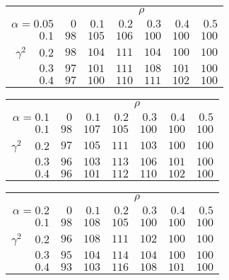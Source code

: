 \begin{tabular}{r|rrrrrr}
\hline\hline
 &\multicolumn{6}{c}{$\rho$} \\ 
 $\alpha = 0.05$ & $0$ & $0.1$ & $0.2$ & $0.3$ & $0.4$ & $0.5$ \\ 
 \hline$0.1$ & $ 98$ & $105$ & $106$ & $100$ & $100$ & $100$\\ 
$\gamma^2\;\;\;$ $0.2$ & $ 98$ & $104$ & $111$ & $104$ & $100$ & $100$\\ 
$0.3$ & $ 97$ & $101$ & $111$ & $108$ & $101$ & $100$\\ 
$0.4$ & $ 97$ & $100$ & $110$ & $111$ & $102$ & $100$\\ 
 \hline 
 \end{tabular}
 
 \vspace{2em} 
 
\begin{tabular}{r|rrrrrr}
\hline\hline
 &\multicolumn{6}{c}{$\rho$} \\ 
 $\alpha = 0.1$ & $0$ & $0.1$ & $0.2$ & $0.3$ & $0.4$ & $0.5$ \\ 
 \hline$0.1$ & $ 98$ & $107$ & $105$ & $100$ & $100$ & $100$\\ 
$\gamma^2\;\;\;$ $0.2$ & $ 97$ & $105$ & $111$ & $103$ & $100$ & $100$\\ 
$0.3$ & $ 96$ & $103$ & $113$ & $106$ & $101$ & $100$\\ 
$0.4$ & $ 96$ & $101$ & $112$ & $110$ & $102$ & $100$\\ 
 \hline 
 \end{tabular}
 
 \vspace{2em} 
 
\begin{tabular}{r|rrrrrr}
\hline\hline
 &\multicolumn{6}{c}{$\rho$} \\ 
 $\alpha = 0.2$ & $0$ & $0.1$ & $0.2$ & $0.3$ & $0.4$ & $0.5$ \\ 
 \hline$0.1$ & $ 98$ & $108$ & $105$ & $100$ & $100$ & $100$\\ 
$\gamma^2\;\;\;$ $0.2$ & $ 96$ & $108$ & $111$ & $102$ & $100$ & $100$\\ 
$0.3$ & $ 95$ & $104$ & $114$ & $104$ & $100$ & $100$\\ 
$0.4$ & $ 93$ & $103$ & $116$ & $108$ & $101$ & $100$\\ 
 \hline 
 \end{tabular}